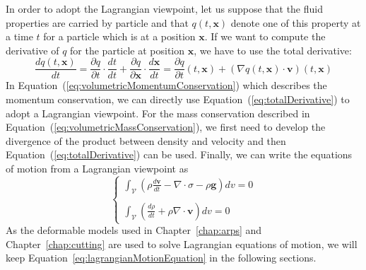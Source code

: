 In order to adopt the Lagrangian viewpoint, let us suppose that the fluid properties are carried by particle and that $q(t,\mathbf{x})$ denote one of this property at a time $t$ for a particle which is at a position $\mathbf{x}$. 
If we want to compute the derivative of $q$ for the particle at position $\mathbf{x}$, we have to use the total derivative:
\begin{equation}
\label{eq:totalDerivative}
\frac{dq(t,\mathbf{x})}{dt} = 
\frac{\partial q}{\partial t}\cdot\frac{dt}{dt} + \frac{\partial q}{\partial \mathbf{x}} \cdot \frac{d\mathbf{x}}{dt} 
= \frac{\partial q}{\partial t}(t,\mathbf{x}) + \left(\nabla q(t,\mathbf{x}) \cdot \mathbf{v}\right)(t,\mathbf{x})
\end{equation}
In Equation~(\ref{eq:volumetricMomentumConservation}) which describes the momentum conservation, we can directly use Equation~(\ref{eq:totalDerivative}) to adopt a Lagrangian viewpoint. 
For the mass conservation described in Equation~(\ref{eq:volumetricMassConservation}), we first need to develop the divergence of the product between density and velocity and then Equation~(\ref{eq:totalDerivative}) can be used.
Finally, we can write the equations of motion from a Lagrangian viewpoint as
\begin{equation}
\label{eq:lagrangianMotionEquation}
\left\lbrace
\begin{array}{l}
\displaystyle 
\int_{\mathcal{V}} 
\left( 
\rho \frac{d\mathbf{v}}{dt}
- \nabla \cdot \sigma - \rho \mathbf{g}  \right) dv = 0 
\\ \\
\displaystyle
\int_{\mathcal{V}} 
\left( \frac{d\rho}{dt} + \rho \nabla \cdot \mathbf{v} \right) dv = 0
\end{array}
\right.
\end{equation}
As the deformable models used in Chapter~\ref{chap:arps} and Chapter~\ref{chap:cutting} are used to solve Lagrangian equations of motion, we will keep Equation~\ref{eq:lagrangianMotionEquation} in the following sections.
